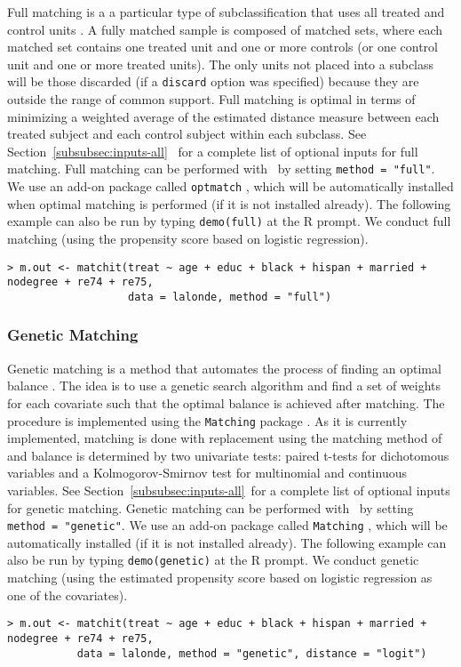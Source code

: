 Full matching is a a particular type of subclassification that uses
all treated and control units \citep{Rosenbaum02, Hansen04}.  A fully
matched sample is composed of matched sets, where each matched set
contains one treated unit and one or more controls (or one control
unit and one or more treated units).  The only units not placed into a
subclass will be those discarded (if a \texttt{discard} option was
specified) because they are outside the range of common support.  Full
matching is optimal in terms of minimizing a weighted average of the
estimated distance measure between each treated subject and each
control subject within each subclass.  See
Section~\ref{subsubsec:inputs-all}~
for a complete list of optional inputs for full matching.  Full
matching can be performed with \MatchIt\ by setting \texttt{method =
  "full"}.  We use an add-on package called \texttt{optmatch}
\citep{Hansen04}, which will be automatically installed when optimal
matching is performed (if it is not installed already).  The following
example can also be run by typing {\tt demo(full)} at the R prompt.
We conduct full matching (using the propensity score based on logistic
regression).
\begin{verbatim}
> m.out <- matchit(treat ~ age + educ + black + hispan + married + nodegree + re74 + re75, 
                   data = lalonde, method = "full")
\end{verbatim}

\subsubsection{Genetic Matching}
\label{subsub:genetic}

Genetic matching is a method that automates the process of finding an
optimal balance \citep{DiaSek05}. The idea is to use a genetic search
algorithm and find a set of weights for each covariate such that the
optimal balance is achieved after matching. The procedure is
implemented using the {\tt Matching} package \citep{Sekhon04}. As it is
currently implemented, matching is done with replacement using the
matching method of \citet{AbaImb04} and balance is determined by 
two univariate tests: paired t-tests for dichotomous variables and a
Kolmogorov-Smirnov test for multinomial and continuous variables.  See
Section~\ref{subsubsec:inputs-all}~for a complete list of optional inputs for genetic matching.  Genetic
matching can be performed with \MatchIt\ by setting \texttt{method =
  "genetic"}.  We use an add-on package called \texttt{Matching}
\citep{Sekhon04}, which will be automatically installed (if it is not
installed already). The following example can also be run by typing
{\tt demo(genetic)} at the R prompt.  We conduct genetic matching
(using the estimated propensity score based on logistic regression as
one of the covariates).
\begin{verbatim}
> m.out <- matchit(treat ~ age + educ + black + hispan + married + nodegree + re74 + re75, 
		   data = lalonde, method = "genetic", distance = "logit")
\end{verbatim}


